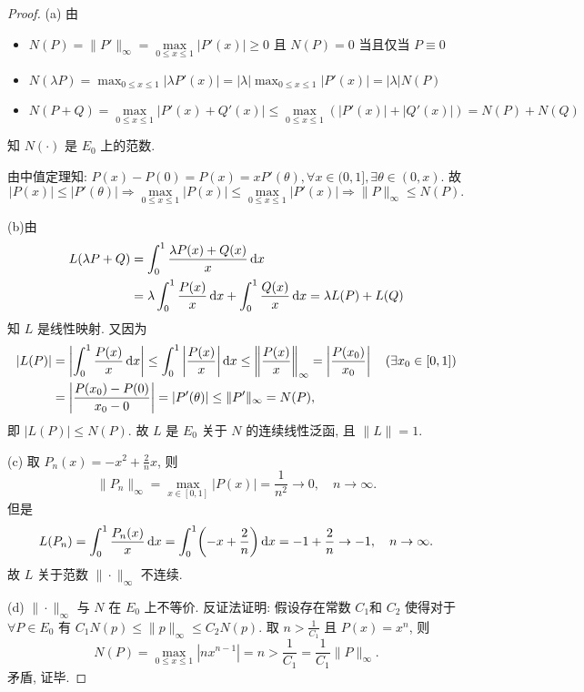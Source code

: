 \begin{proof}
(a) 由
\begin{itemize}
\item $N(P)=\|P'\|_{\infty}=\max\limits_{0\leq x\leq 1}|P'(x)|\geq 0$ 且 $N(P)=0$ 当且仅当 $P\equiv 0$
\item $N(\lambda P)=\max_{0\leq x\leq 1}|\lambda P'(x)|=|\lambda|\max_{0\leq x\leq 1}|P'(x)|=|\lambda|N(P)$
\item $N(P+Q)=\max\limits_{0\leq x\leq 1}|P'(x)+Q'(x)|\leq\max\limits_{0\leq x\leq 1}(|P'(x)|+|Q'(x)|)=N(P)+N(Q)$
\end{itemize}
知 $N(\cdot)$ 是 $E_0$ 上的范数.

由中值定理知: $P(x)-P(0)=P(x)=xP'(\theta),\forall x\in (0,1],\exists\theta\in (0,x)$. 故
\[|P(x)|\leq |P'(\theta)|\Rightarrow\max_{0\leq x\leq 1}|P(x)|\leq\max_{0\leq x\leq 1}|P'(x)|\Rightarrow \|P\|_{\infty}\leq N(P).\]

(b)由
\begin{align*}
    L(\lambda P+Q)
    & =\int_0^1\frac{\lambda P(x)+Q(x)}{x}\mathop{}\!\mathrm{d} x \\
    & =\lambda\int_0^1\frac{P(x)}{x}\mathop{}\!\mathrm{d} x+\int_0^1\frac{Q(x)}{x}\mathop{}\!\mathrm{d} x=\lambda L(P)+L(Q)
\end{align*}
知 $L$ 是线性映射. 又因为
\begin{align*}
|L(P)|
&=\left|\int_0^1\frac{P(x)}{x}\mathop{}\!\mathrm{d} x\right|\leq\int_0^1\left|\frac{P(x)}{x}\right|\mathop{}\!\mathrm{d} x\leq\left\|\frac{P(x)}{x}\right\|_{\infty}=\left\lvert\frac{P(x_0)}{x_0}\right\rvert\quad(\exists x_0\in [0,1])\\
&=\left\lvert\frac{P(x_0)-P(0)}{x_0-0}\right\rvert=|P'(\theta)|\leq\|P'\|_{\infty}=N(P),
\end{align*}
即 $|L(P)|\leq N(P)$.
故 $L$ 是 $E_0$ 关于 $N$ 的连续线性泛函, 且 $\|L\|=1$.

(c) 取 $P_n(x)=-x^2+\frac{2}{n}x$, 则
\[\|P_n\|_{\infty}=\max_{x\in [0,1]}|P(x)|=\frac{1}{n^2}\to 0,\quad n\to\infty.\]
但是
\[L(P_n)=\int_0^1 \frac{P_n(x)}{x}\mathop{}\!\mathrm{d} x=\int_0^1 \biggl(-x+\frac{2}{n}\biggr)\mathop{}\!\mathrm{d} x=-1+\frac{2}{n}\to -1,\quad n\to\infty.\]
故 $L$ 关于范数 $\|\cdot\|_{\infty}$ 不连续.

(d) $\|\cdot\|_{\infty}$ 与 $N$ 在 $E_0$ 上不等价.
反证法证明: 
假设存在常数 $C_1 $和 $C_2$ 使得对于 $\forall P\in E_0$ 
有 $C_1N(p)\leq\|p\|_{\infty}\leq C_2N(p)$. 取 $n>\frac{1}{C_1}$ 且 $P(x)=x^n$, 则
\[N(P)=\max_{0\leq x\leq 1}|nx^{n-1}|=n>\frac{1}{C_1}=\frac{1}{C_1}\|P\|_{\infty}.\]
矛盾, 证毕.
\end{proof}



